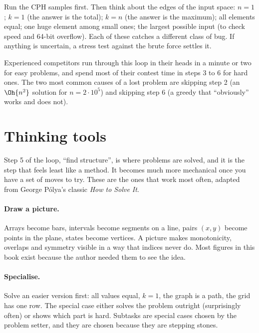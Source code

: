 Run the CPH samples first. Then think about the edges of the input space: $n = 1$; $k = 1$ (the answer is the total);
$k = n$ (the answer is the maximum); all elements equal; one huge element among small ones; the largest possible input (to
check speed and 64-bit overflow). Each of these catches a different class of bug. If anything is uncertain, a stress test
against the brute force settles it.

\begin{fact}
Experienced competitors run through this loop in their heads in a minute or two for easy problems, and spend most of their
contest time in steps 3 to 6 for hard ones. The two most common causes of a lost problem are skipping step 2 (an $\Oh{n^2}$
solution for $n = 2 \cdot 10^5$) and skipping step 6 (a greedy that ``obviously'' works and does not).
\end{fact}

\section[Thinking tools]{Thinking tools \hfill \bronze}\label{sec:thinking}

Step 5 of the loop, ``find structure'', is where problems are solved, and it is the step that feels least like a method.
It becomes much more mechanical once you have a set of moves to try. These are the ones that work most often, adapted from
George P\'olya's classic \emph{How to Solve It}.

\paragraph{Draw a picture.} Arrays become bars, intervals become segments on a line, pairs $(x, y)$ become points in the
plane, states become vertices. A picture makes monotonicity, overlaps and symmetry visible in a way that indices never do.
Most figures in this book exist because the author needed them to see the idea.

\paragraph{Specialise.} Solve an easier version first: all values equal, $k = 1$, the graph is a path, the grid has one row.
The special case either solves the problem outright (surprisingly often) or shows which part is hard. Subtasks are special
cases chosen by the problem setter, and they are chosen because they are stepping stones.

